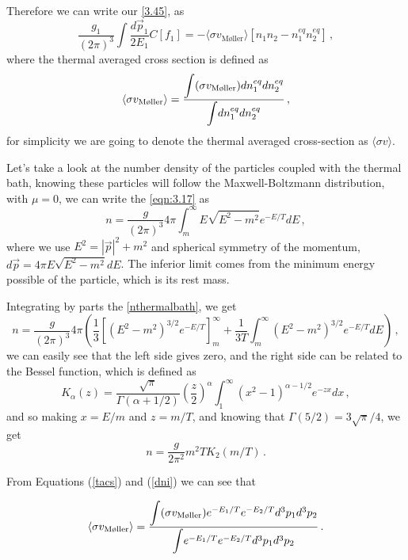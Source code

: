Therefore we can write our \autoref{3.45}, as
\begin{equation}
	\label{eqn:3.47}
	\frac{g_1}{(2\pi)^3}\int \frac{d\vec{p}_1}{2E_1}C[f_1]=-\langle\sigma v_{\textrm{M{\o}ller}}\rangle[n_1n_2-n_1^{eq}n_2^{eq}]\,,
\end{equation}
where the thermal averaged cross section is defined as
\begin{equation}
	\label{tacs}
	\langle \sigma v_{\textrm{M{\o}ller}}\rangle=\dfrac{\mathlarger{\int} (\sigma v_{\textrm{M{\o}ller}})dn_1^{eq}dn_2^{eq}}{\mathlarger{\int} dn_1^{eq}dn_2^{eq}}\,,
\end{equation}
for simplicity we are going to denote the thermal averaged cross-section as $\langle\sigma v\rangle$.

Let's take a look at the number density of the particles coupled with the thermal bath, knowing these particles will follow the Maxwell-Boltzmann distribution, with $\mu=0$, we can write the \autoref{eqn:3.17} as
\begin{equation}
	\label{nthermalbath}
	n=\frac{g}{(2\pi)^3}4\pi\int_{m}^{\infty} E\sqrt{E^2-m^2}e^{-E/T}dE\,,
\end{equation} 
where we use $E^2=|\vec{p}|^2+m^2$ and spherical symmetry of the momentum, $d\vec{p}=4\pi E \sqrt{E^2-m^2}dE$. The inferior limit comes from the minimum energy possible of the particle, which is its rest mass.

Integrating by parts the \autoref{nthermalbath}, we get
\begin{equation}
	n=\frac{g}{(2\pi)^3}4\pi\left(\frac{1}{3}\left[(E^2-m^2)^{3/2}e^{-E/T}\right]_m^\infty+\frac{1}{3T}\int_{m}^{\infty}(E^2-m^2)^{3/2}e^{-E/T}dE\right)\,,
\end{equation}
we can easily see that the left side gives zero, and the right side can be related to the Bessel function, which is defined as
\begin{equation}
	 \label{bessel}
	 K_\alpha(z)=\frac{\sqrt{\pi}}{\Gamma(\alpha+1/2)}\left(\frac{z}{2}\right)^\alpha\int_{1}^{\infty}(x^2-1)^{\alpha-1/2}e^{-zx}dx\,,
\end{equation}
and so making $x=E/m$ and $z=m/T$, and knowing that $\Gamma(5/2)=3\sqrt{\pi}/4$, we get
\begin{equation}
	\label{nbessel}
	n=\frac{g}{2\pi^2}m^2TK_2(m/T)\,.
\end{equation}

From Equations (\ref{tacs}) and (\ref{dni}) we can see that

\begin{equation}
	\label{eqn:3.52}
	\langle \sigma v_{\textrm{M{\o}ller}}\rangle=\dfrac{\mathlarger{\int}(\sigma v_{\textrm{M{\o}ller}})e^{-E_1/T}e^{-E_2/T}d^3p_1d^3p_2}{\mathlarger{\int} e^{-E_1/T}e^{-E_2/T}d^3p_1d^3p_2}	\,.
\end{equation}


